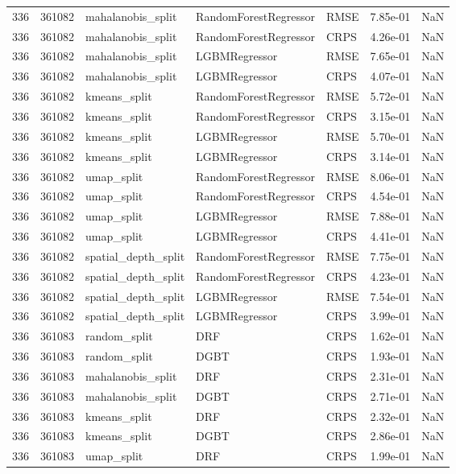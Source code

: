 \begin{tabular}{rrlllrr}
336 & 361082 & mahalanobis\_split & RandomForestRegressor & RMSE & 7.85e-01 & NaN \\
336 & 361082 & mahalanobis\_split & RandomForestRegressor & CRPS & 4.26e-01 & NaN \\
336 & 361082 & mahalanobis\_split & LGBMRegressor & RMSE & 7.65e-01 & NaN \\
336 & 361082 & mahalanobis\_split & LGBMRegressor & CRPS & 4.07e-01 & NaN \\
336 & 361082 & kmeans\_split & RandomForestRegressor & RMSE & 5.72e-01 & NaN \\
336 & 361082 & kmeans\_split & RandomForestRegressor & CRPS & 3.15e-01 & NaN \\
336 & 361082 & kmeans\_split & LGBMRegressor & RMSE & 5.70e-01 & NaN \\
336 & 361082 & kmeans\_split & LGBMRegressor & CRPS & 3.14e-01 & NaN \\
336 & 361082 & umap\_split & RandomForestRegressor & RMSE & 8.06e-01 & NaN \\
336 & 361082 & umap\_split & RandomForestRegressor & CRPS & 4.54e-01 & NaN \\
336 & 361082 & umap\_split & LGBMRegressor & RMSE & 7.88e-01 & NaN \\
336 & 361082 & umap\_split & LGBMRegressor & CRPS & 4.41e-01 & NaN \\
336 & 361082 & spatial\_depth\_split & RandomForestRegressor & RMSE & 7.75e-01 & NaN \\
336 & 361082 & spatial\_depth\_split & RandomForestRegressor & CRPS & 4.23e-01 & NaN \\
336 & 361082 & spatial\_depth\_split & LGBMRegressor & RMSE & 7.54e-01 & NaN \\
336 & 361082 & spatial\_depth\_split & LGBMRegressor & CRPS & 3.99e-01 & NaN \\
336 & 361083 & random\_split & DRF & CRPS & 1.62e-01 & NaN \\
336 & 361083 & random\_split & DGBT & CRPS & 1.93e-01 & NaN \\
336 & 361083 & mahalanobis\_split & DRF & CRPS & 2.31e-01 & NaN \\
336 & 361083 & mahalanobis\_split & DGBT & CRPS & 2.71e-01 & NaN \\
336 & 361083 & kmeans\_split & DRF & CRPS & 2.32e-01 & NaN \\
336 & 361083 & kmeans\_split & DGBT & CRPS & 2.86e-01 & NaN \\
336 & 361083 & umap\_split & DRF & CRPS & 1.99e-01 & NaN \\

\end{tabular}
